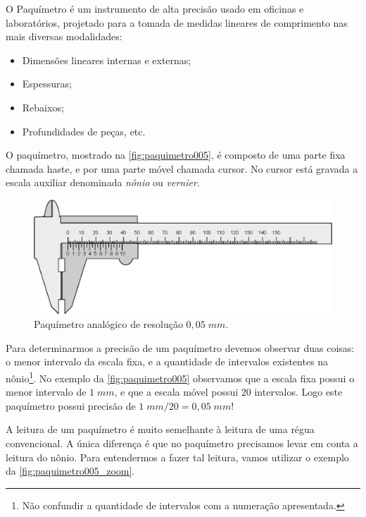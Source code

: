O Paquímetro é um instrumento de alta precisão usado em oficinas e laboratórios, projetado para a tomada de medidas lineares de comprimento nas mais diversas modalidades:
\begin{itemize}
\item Dimensões lineares internas e externas;
\item Espessuras;
\item Rebaixos;
\item Profundidades de peças, etc.
\end{itemize}

O paquímetro, mostrado na \autoref{fig:paquimetro005}, é composto de uma parte fixa chamada haste, e por uma parte móvel chamada cursor. No cursor está gravada a escala auxiliar denominada \emph{nônio} ou \emph{vernier}.

\begin{figure}[!htb]
\centering
\includegraphics[scale=0.7]{figs/paquimetro005.eps}
\caption{Paquímetro analógico de resolução $0,05\;mm$.}
\label{fig:paquimetro005}
\end{figure}

Para determinarmos a precisão de um paquímetro devemos observar duas coisas: o menor intervalo da escala fixa, e a quantidade de intervalos existentes na nônio\footnote{Não confundir a quantidade de intervalos com a numeração apresentada.}.
No exemplo da \autoref{fig:paquimetro005} observamos que a escala fixa possui o menor intervalo de $1\;mm$, e que a escala móvel possui $20$ intervalos. Logo este paquímetro possui precisão de $1\;mm / 20 = 0,05\;mm$!

A leitura de um paquímetro é muito semelhante à leitura de uma régua convencional. A única diferença é que no paquímetro precisamos levar em conta a leitura do nônio. Para entendermos a fazer tal leitura, vamos utilizar o exemplo da \autoref{fig:paquimetro005_zoom}.


